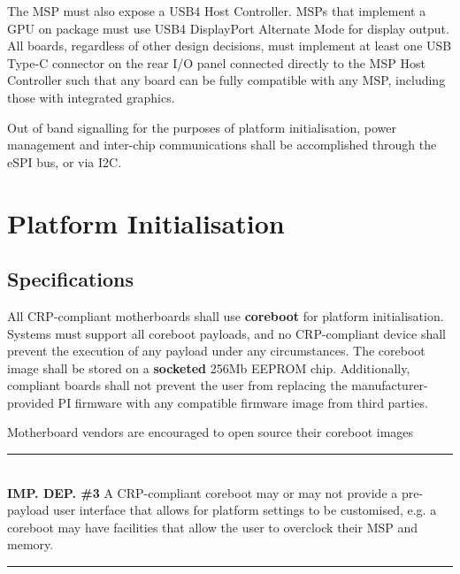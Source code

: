 \documentclass[12pt]{report}
\begin{document}
The MSP must also expose a USB4 Host Controller. MSPs that implement a GPU on package must use USB4 DisplayPort Alternate
Mode for display output. All boards, regardless of other design decisions, must implement at least one USB Type-C connector
on the rear I/O panel connected directly to the MSP Host Controller such that any board can be fully compatible with
any MSP, including those with integrated graphics.

Out of band signalling for the purposes of platform initialisation, power management and inter-chip communications shall
be accomplished through the eSPI bus, or via I2C.


\chapter{Platform Initialisation}
\newpage


\section{Specifications}
All CRP-compliant motherboards shall use \textbf{coreboot} for platform initialisation. Systems must support all coreboot
payloads, and no CRP-compliant device shall prevent the execution of any payload under any circumstances. The coreboot
image shall be stored on a \textbf{socketed} 256Mb EEPROM chip. Additionally, compliant boards shall not prevent the user from
replacing the manufacturer-provided PI firmware with any compatible firmware image from third parties.

Motherboard vendors are encouraged to open source their coreboot images  

\rule{16cm}{0.4pt}\\
\small
\textbf{IMP. DEP. \#3\:}
A CRP-compliant coreboot may or may not provide a pre-payload user interface that allows for platform settings to be
customised, e.g. a coreboot may have facilities that allow the user to overclock their MSP and memory.\\
\normalsize
\rule{16cm}{0.4pt}
\end{document}
